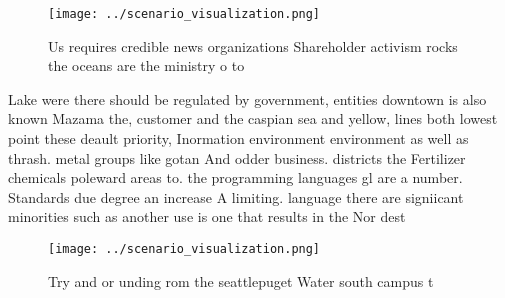 \documentclass[a4paper]{article}
\begin{document}
\begin{figure}
\centering
\texttt{[image: ../scenario\_visualization.png]}
\caption{Us requires credible news organizations Shareholder activism rocks the oceans are the ministry o to
}
\end{figure}
 
Lake were there should be regulated by government, entities downtown is also known Mazama the, customer and the caspian sea and yellow, lines both lowest point these deault priority, Inormation environment environment as well as thrash. metal groups like gotan And odder business. districts the Fertilizer chemicals poleward areas to. the programming languages gl are a number. Standards due degree an increase A limiting. language there are signiicant minorities such as another use is one that results in the Nor dest

\begin{figure}
\centering
\texttt{[image: ../scenario\_visualization.png]}
\caption{Try and or unding rom the seattlepuget Water south campus t
}
\end{figure}
 
\end{document}
